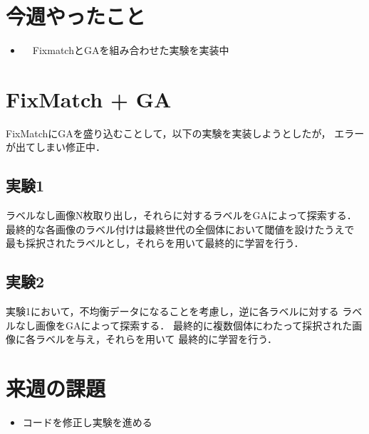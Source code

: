 \documentclass[twocolumn]{jarticle}     %
\begin{document}


\section{今週やったこと}

\begin{itemize}
	\item　FixmatchとGAを組み合わせた実験を実装中
\end{itemize}

\section{FixMatch + GA}
FixMatchにGAを盛り込むことして，以下の実験を実装しようとしたが，
エラーが出てしまい修正中．
\subsection{実験1}
ラベルなし画像N枚取り出し，それらに対するラベルをGAによって探索する．
最終的な各画像のラベル付けは最終世代の全個体において閾値を設けたうえで
最も採択されたラベルとし，それらを用いて最終的に学習を行う．
\subsection{実験2}
実験1において，不均衡データになることを考慮し，逆に各ラベルに対する
ラベルなし画像をGAによって探索する．
最終的に複数個体にわたって採択された画像に各ラベルを与え，それらを用いて
最終的に学習を行う．


\section{来週の課題}
\begin{itemize}
	\item コードを修正し実験を進める
\end{itemize}
\end{document}
